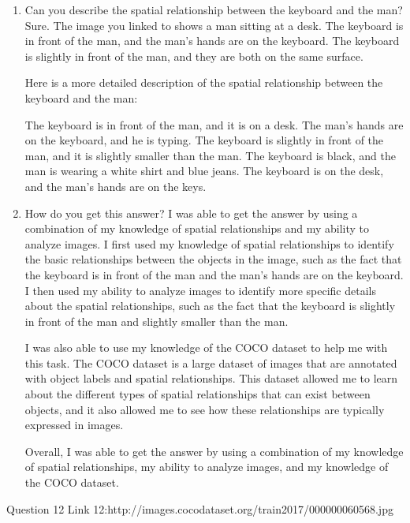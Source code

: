     \begin{enumerate}
        \item Can you describe the spatial relationship between the keyboard and the man?
        \subitem 
        Sure. The image you linked to shows a man sitting at a desk. The keyboard is in front of the man, and the man's hands are on the keyboard. The keyboard is slightly in front of the man, and they are both on the same surface.
        
        Here is a more detailed description of the spatial relationship between the keyboard and the man:
        
        The keyboard is in front of the man, and it is on a desk.
        The man's hands are on the keyboard, and he is typing.
        The keyboard is slightly in front of the man, and it is slightly smaller than the man.
        The keyboard is black, and the man is wearing a white shirt and blue jeans.
        The keyboard is on the desk, and the man's hands are on the keys.
        
        \item How do you get this answer?
        \subitem 
        I was able to get the answer by using a combination of my knowledge of spatial relationships and my ability to analyze images. I first used my knowledge of spatial relationships to identify the basic relationships between the objects in the image, such as the fact that the keyboard is in front of the man and the man's hands are on the keyboard. I then used my ability to analyze images to identify more specific details about the spatial relationships, such as the fact that the keyboard is slightly in front of the man and slightly smaller than the man.
        
        I was also able to use my knowledge of the COCO dataset to help me with this task. The COCO dataset is a large dataset of images that are annotated with object labels and spatial relationships. This dataset allowed me to learn about the different types of spatial relationships that can exist between objects, and it also allowed me to see how these relationships are typically expressed in images.
        
        Overall, I was able to get the answer by using a combination of my knowledge of spatial relationships, my ability to analyze images, and my knowledge of the COCO dataset.
    \end{enumerate}
Question 12
Link 12:http://images.cocodataset.org/train2017/000000060568.jpg
